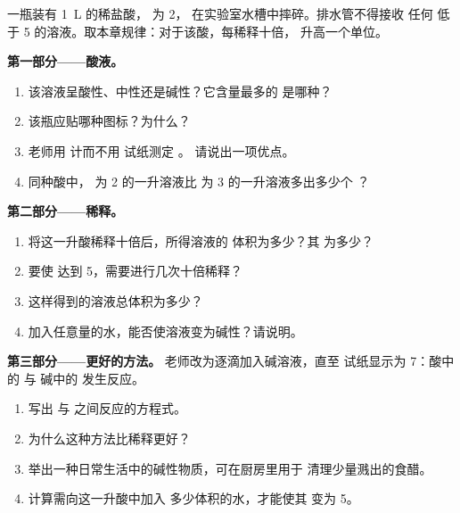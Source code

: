 \begin{problem}
\label{pb:g9:acids-bases-ph:1}
一瓶装有 \qty{1}{L} 的稀盐酸， 为 2，
在实验室水槽中摔碎。排水管不得接收
任何  低于 5 的溶液。取本章规律：对于该酸，每稀释十倍，
 升高一个单位。

\medskip
\noindent\textbf{第一部分——酸液。}
\begin{enumerate}
  \item 该溶液呈酸性、中性还是碱性？它含量最多的
        是哪种？
  \item 该瓶应贴哪种图标？为什么？
  \item 老师用  计而不用  试纸测定 。
        请说出一项优点。
  \item 同种酸中， 为 2 的一升溶液比
         为 3 的一升溶液多出多少个  ？
\end{enumerate}

\medskip
\noindent\textbf{第二部分——稀释。}
\begin{enumerate}[resume]
  \item 将这一升酸稀释十倍后，所得溶液的
        体积为多少？其  为多少？
  \item 要使  达到 5，需要进行几次十倍稀释？
  \item 这样得到的溶液总体积为多少？
  \item 加入任意量的水，能否使溶液变为碱性？请说明。
\end{enumerate}

\medskip
\noindent\textbf{第三部分——更好的方法。}
老师改为逐滴加入碱溶液，直至
 试纸显示为 7：酸中的  与
碱中的  发生反应。
\begin{enumerate}[resume]
  \item 写出  与 
        之间反应的方程式。
  \item 为什么这种方法比稀释更好？
  \item 举出一种日常生活中的碱性物质，可在厨房里用于
        清理少量溅出的食醋。
  \item 计算需向这一升酸中加入
        多少体积的水，才能使其  变为 5。
\end{enumerate}
\end{problem}
